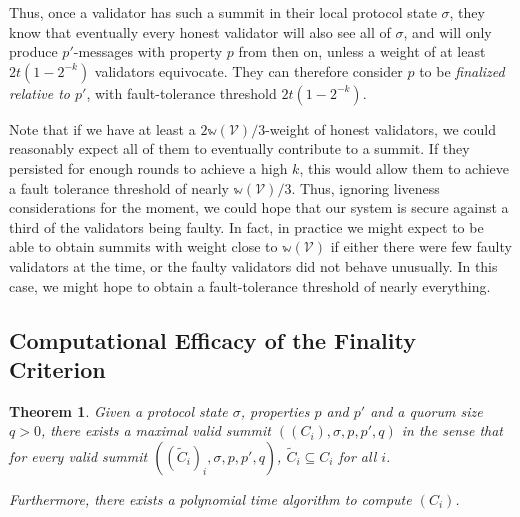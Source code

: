 \documentclass[12pt]{article}
\newtheorem{theorem}{Theorem}
\begin{document}
Thus, once a validator has such a summit in their local protocol state $\sigma$, they know that eventually every honest validator will also see all of $\sigma$, and will only produce $p'$-messages with property $p$ from then on, unless a weight of at least $2t (1 - 2^{-k})$ validators equivocate. They can therefore consider $p$ to be \emph{finalized relative to $p'$}, with fault-tolerance threshold $2t (1 - 2^{-k})$.

Note that if we have at least a $2\mathbb{w}(\mathcal{V})/3$-weight of honest validators, we could reasonably expect all of them to eventually contribute to a summit. If they persisted for enough rounds to achieve a high $k$, this would allow them to achieve a fault tolerance threshold of nearly $\mathbb{w}(\mathcal{V})/3$. Thus, ignoring liveness considerations for the moment, we could hope that our system is secure against a third of the validators being faulty. In fact, in practice we might expect to be able to obtain summits with weight close to $\mathbb{w}(\mathcal{V})$ if either there were few faulty validators at the time, or the faulty validators did not behave unusually. In this case, we might hope to obtain a fault-tolerance threshold of nearly everything.


\subsection{Computational Efficacy of the Finality Criterion}

\begin{theorem}
  Given a protocol state $\sigma$, properties $p$ and $p'$ and a quorum size $q > 0$, there exists a maximal valid summit $((C_i), \sigma, p, p', q)$ in the sense that for every valid summit $((\tilde{C}_i)_i, \sigma, p, p', q)$, $\tilde{C}_i \subseteq C_i$ for all $i$.

  Furthermore, there exists a polynomial time algorithm to compute $(C_i)$.
\end{theorem}
\end{document}

